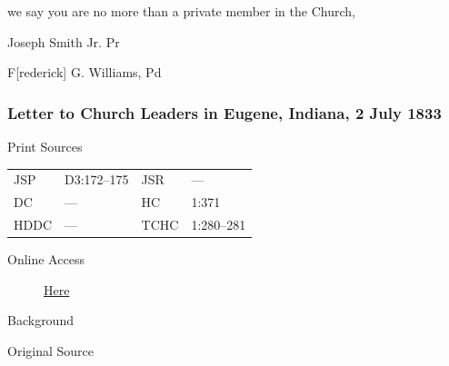 				we say you are no more than a private member in the Church,
				
				\begin{tightright}
				Joseph Smith Jr. Pr
				
				F[rederick] G. Williams, Pd
				\end{tightright}
				
		\subsubsection{Letter to Church Leaders in Eugene, Indiana, 2 July 1833}
			\label{EMS-1833-JS-2-JUL-1833-CL}
		
			\begin{description}
				\item[Print Sources]
			\end{description}

				\begin{tabular}{p{0.5in}p{1in}p{0.5in}p{1in}}
				JSP	 	& D3:172--175		& JSR 		& --- \\
				DC	 	& --- 				& HC 		& 1:371 \\
				HDDC 	& ---				& TCHC 		& 1:280--281 \\
				\end{tabular}
			
			\begin{description}
				\item[Online Access] \href{https://www.josephsmithpapers.org/paper-summary/letter-to-church-leaders-in-eugene-indiana-2-july-1833/1}{Here}
			\end{description}
			
			\begin{description}
				\item[Background]
			\end{description}
			
			
			\begin{description}
				\item[Original Source]
			\end{description}
			
